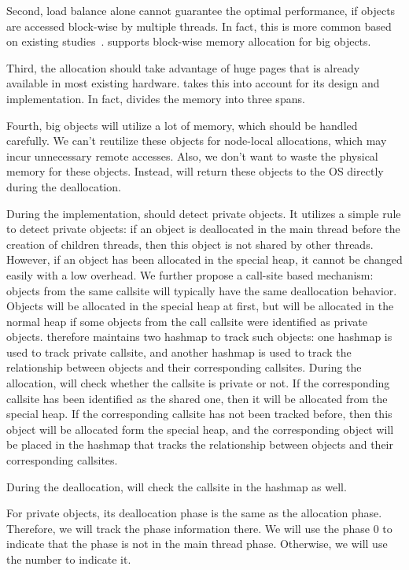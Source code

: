 Second, load balance alone cannot guarantee the optimal performance, if objects are accessed block-wise by multiple threads. In fact, this is more common based on existing studies~\cite{XULIU, MemProf}. \NM{} supports block-wise memory allocation for big objects.  

Third, the allocation should take advantage of huge pages that is already available in most existing hardware. \NM{} takes this into account for its design and implementation. In fact, \NM{} divides the memory into three spans. 

Fourth, big objects will utilize a lot of memory, which should be handled carefully. We can't reutilize these objects for node-local allocations, which may incur unnecessary remote accesses. Also, we don't want to waste the physical memory for these objects. Instead, \NM{}  will return these objects to the OS directly during the deallocation. 

During the implementation, \NM{} should detect private objects. It utilizes a simple rule to detect private objects: if an object is deallocated in the main thread before the creation of children threads, then this object is not shared by other threads. However, if an object has been allocated in the special heap, it cannot be changed easily with a low overhead. We further propose a call-site based mechanism: objects from the same callsite will typically have the same deallocation behavior. Objects will be allocated in the special heap at first, but will be allocated in the normal heap if some objects from the call callsite were identified as private objects. \NM{} therefore maintains two hashmap to track such objects: one hashmap is used to track private callsite, and another hashmap is used to track the relationship between objects and their corresponding callsites. 
During the allocation, \NM{} will check whether the callsite is private or not. If the corresponding callsite has been identified as the shared one, then it will be allocated from the special heap. If the corresponding callsite has not been tracked before, then this object will be allocated form the special heap, and the corresponding object will be placed in the hashmap that tracks the relationship between objects and their corresponding callsites. 

During the deallocation, \NM{} will check the callsite in the hashmap as well. 

For private objects, its deallocation phase is the same as the allocation phase. Therefore, we will track the phase information there. 
We will use the phase 0 to indicate that the phase is not in the main thread phase. Otherwise, we will use the number to indicate it.   

